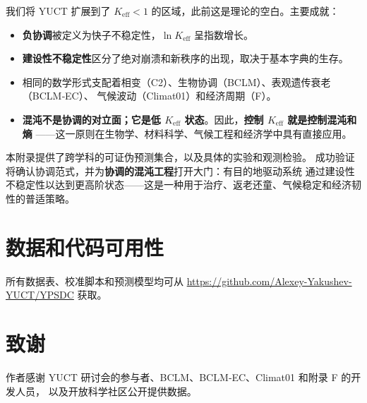 \documentclass[12pt,a4paper]{article}
\newcommand{\Keff}{K_{\mathrm{eff}}}
\begin{document}
	我们将 YUCT 扩展到了 $\Keff < 1$ 的区域，此前这是理论的空白。主要成就：
	
	\begin{itemize}
		\item \textbf{负协调}被定义为快子不稳定性，$\ln \Keff$ 呈指数增长。
		\item \textbf{建设性不稳定性}区分了绝对崩溃和新秩序的出现，取决于基本字典的生存。
		\item 相同的数学形式支配着相变（C2）、生物协调（BCLM）、表观遗传衰老（BCLM‑EC）、
		气候波动（Climat01）和经济周期（F）。
		\item \textbf{混沌不是协调的对立面；它是低 $\Keff$ 状态}。因此，\textbf{控制 $\Keff$ 就是控制混沌和熵}
		——这一原则在生物学、材料科学、气候工程和经济学中具有直接应用。
	\end{itemize}
	
	本附录提供了跨学科的可证伪预测集合，以及具体的实验和观测检验。
	成功验证将确认协调范式，并为\textbf{协调的混沌工程}打开大门：有目的地驱动系统
	通过建设性不稳定性以达到更高阶状态——这是一种用于治疗、返老还童、气候稳定和经济韧性的普适策略。
	
	\section*{数据和代码可用性}
	
	所有数据表、校准脚本和预测模型均可从
	\url{https://github.com/Alexey-Yakushev-YUCT/YPSDC} 获取。
	
	\section*{致谢}
	
	作者感谢 YUCT 研讨会的参与者、BCLM、BCLM‑EC、Climat01 和附录 F 的开发人员，
	以及开放科学社区公开提供数据。
	
\end{document}
